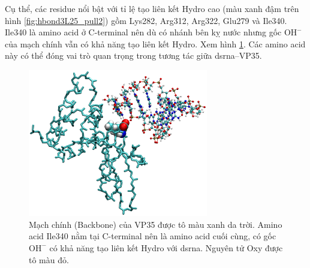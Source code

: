 \documentclass[12pt,a4paper,reqno, oneside]{book}
\begin{document}
Cụ thể, các \gls{residue} nổi bật với tỉ lệ tạo liên kết Hydro cao (màu xanh đậm trên hình \ref{fig:hbond3L25_pull2}) gồm Lys282, Arg312, Arg322, Glu279 và Ile340. Ile340 là amino acid ở C-terminal nên dù có nhánh bên kỵ nước nhưng gốc $\text{OH}^{-}$ của mạch chính vẫn có khả năng tạo liên kết Hydro. Xem hình \ref{fig:Ile340}. Các amino acid này có thể đóng vai trò quan trọng trong tương tác giữa \gls{dsrna}--VP35.
\begin{figure}[h]
\centering
\includegraphics[width=0.7\textwidth,natwidth=610,natheight=642]{ILE340}
\caption{Mạch chính (Backbone) của VP35 được tô màu xanh da trời. Amino acid Ile340 nằm tại C-terminal nên là amino acid cuối cùng, có gốc $\text{OH}^{-}$ có khả năng tạo liên kết Hydro với \gls{dsrna}. Nguyên tử Oxy được tô màu đỏ.}
\label{fig:Ile340}
\end{figure}
\end{document}
